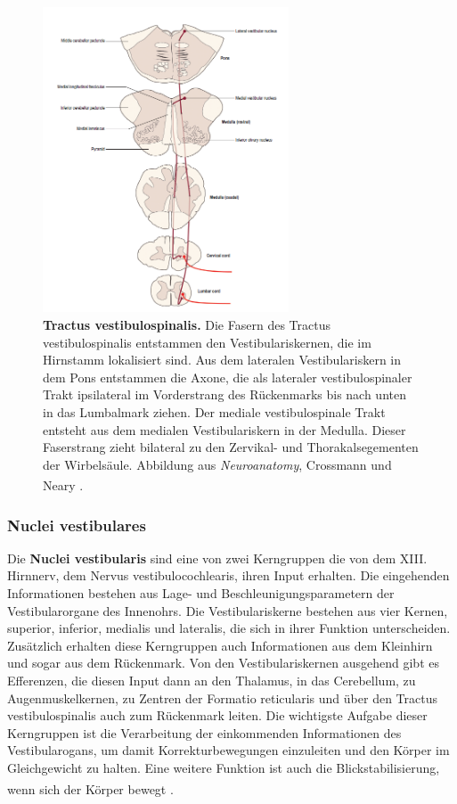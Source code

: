 \documentclass[12pt,a4paper,pdftex]{article}
\begin{document}
\begin{figure}[H]
    \centering
    \includegraphics[width=0.65\textwidth]{pictures/Bilder_Laura/vestibulospinal_tract.PNG}
    \caption[Tractus vestibulospinalis]{\textbf{Tractus vestibulospinalis.} Die Fasern des Tractus vestibulospinalis entstammen den Vestibulariskernen, die im Hirnstamm lokalisiert sind. Aus dem lateralen Vestibulariskern in dem Pons entstammen die Axone, die als lateraler vestibulospinaler Trakt ipsilateral im Vorderstrang des Rückenmarks bis nach unten in das Lumbalmark ziehen. Der mediale vestibulospinale Trakt entsteht aus dem medialen Vestibulariskern in der Medulla. Dieser Faserstrang zieht bilateral zu den Zervikal- und Thorakalsegementen der Wirbelsäule. Abbildung aus \textit{Neuroanatomy}, Crossmann und Neary \textsuperscript{\cite[8]{crossman2014neuroanatomy}}.}
    \label{fig:tr_vestibulospinalis}
\end{figure}

\subsubsection*{Nuclei vestibulares} 
Die \textbf{Nuclei vestibularis} sind eine von zwei Kerngruppen die von dem XIII. Hirnnerv, dem Nervus vestibulocochlearis, ihren Input erhalten. Die eingehenden Informationen bestehen aus Lage- und Beschleunigungsparametern der Vestibularorgane des Innenohrs. Die Vestibulariskerne bestehen aus vier Kernen, superior, inferior, medialis und lateralis, die sich in ihrer Funktion unterscheiden. Zusätzlich erhalten diese Kerngruppen auch Informationen aus dem Kleinhirn und sogar aus dem Rückenmark. Von den Vestibulariskernen ausgehend gibt es Efferenzen, die diesen Input dann an den Thalamus, in das Cerebellum, zu Augenmuskelkernen, zu Zentren der Formatio reticularis und über den Tractus vestibulospinalis auch zum Rückenmark leiten. Die wichtigste Aufgabe dieser Kerngruppen ist die Verarbeitung der einkommenden Informationen des Vestibularogans, um damit Korrekturbewegungen einzuleiten und den Körper im Gleichgewicht zu halten. Eine weitere Funktion ist auch die Blickstabilisierung, wenn sich der Körper bewegt \textsuperscript{\cite[5]{trepel2011neuroanatomie}}.  
\end{document}
